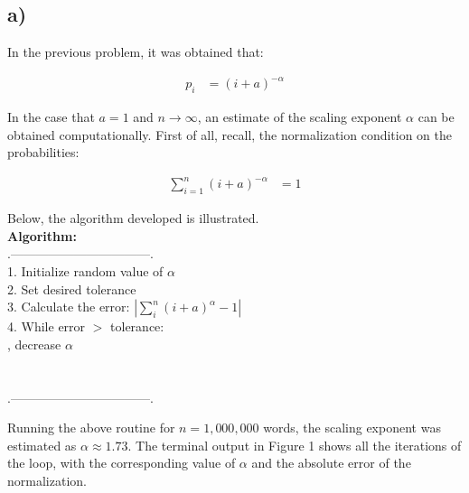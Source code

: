 \documentclass{article}
\begin{document}
\subsection{a)}
In the previous problem, it was obtained that:

\begin{align}
p_i &= (i+a)^{-\alpha}
\end{align}

In the case that $a=1$ and $n\to\infty$, an estimate of the scaling exponent $\alpha$ can be obtained computationally. First of all, recall, the normalization condition on the probabilities:

\begin{align}
\sum_{i=1}^{n} (i+a)^{-\alpha} &= 1 
\end{align}

Below, the algorithm developed is illustrated. \\

\textbf{Algorithm:} \\
.---------------------------------.\\
1. Initialize random value of $\alpha$ \\
2. Set desired tolerance \\
3. Calculate the error: $| \sum_i^{n} (i+a)^{\alpha} - 1 | $ \\
4. While error $>$ tolerance: \\
	, decrease $\alpha$ \\
	 \\
	 \\
.---------------------------------.

Running the above routine for $n = 1,000,000$ words, the scaling exponent was estimated as $\alpha \approx 1.73$. The terminal output in Figure 1 shows all the iterations of the loop, with the corresponding value of $\alpha$ and the absolute error of the normalization.
\end{document}
